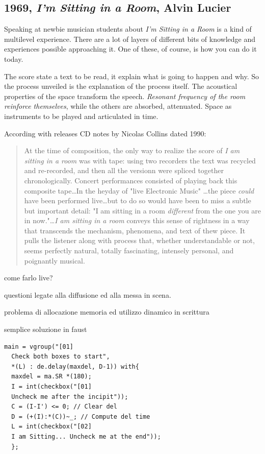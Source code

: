\documentclass[twoside,a4paper]{article}
\begin{document}

\subsection{1969, \emph{I'm Sitting in a Room}, Alvin Lucier}

Speaking at newbie musician students about \emph{I'm Sitting in a Room} is a kind of multilevel experience. There are a lot of layers of different bits of knowledge and experiences possible approaching it. One of these, of course, is how you can do it today. 

The score state a text to be read, it explain what is going to happen and why. So the process unveiled is the explanation of the process itself. The acoustical properties of the space transform the speech. \emph{Resonant frequency of the room reinforce themselves}, while the others are absorbed, attenuated. Space as instruments to be played and articulated in time. 

According with releases CD notes by Nicolas Collins dated 1990:

\begin{quote}
At the time of composition, the only way to realize the score of \emph{I am sitting in a room} was with tape: using two recorders the text was recycled and re-recorded, and then all the versionn were spliced together chronologically. Concert performances consisted of playing back this composite tape\ldots In the heyday of "live Electronic Music" \ldots the piece \emph{could} have been performed live\ldots but to do so would have been to miss a subtle but important detail: "I am sitting in a room \emph{different} from the one you are in now."\ldots \emph{I am sitting in a room} conveys this sense of rightness in a way that transcends the mechanism, phenomena, and text of thew piece. It pulls the listener along with process that, whether understandable or not, seems perfectly natural, totally fascinating, intensely personal, and poignantly musical. 
\end{quote}

come farlo live?

questioni legate alla diffusione ed alla messa in scena.

problema di allocazione memoria ed utilizzo dinamico in scrittura

semplice soluzione in faust

\begin{lstlisting}
main = vgroup("[01]
  Check both boxes to start",
  *(L) : de.delay(maxdel, D-1)) with{
  maxdel = ma.SR *(180);
  I = int(checkbox("[01]
  Uncheck me after the incipit"));
  C = (I-I') <= 0; // Clear del
  D = (+(I):*(C))~_; // Compute del time
  L = int(checkbox("[02]
  I am Sitting... Uncheck me at the end"));
  };
\end{lstlisting}
\end{document}
